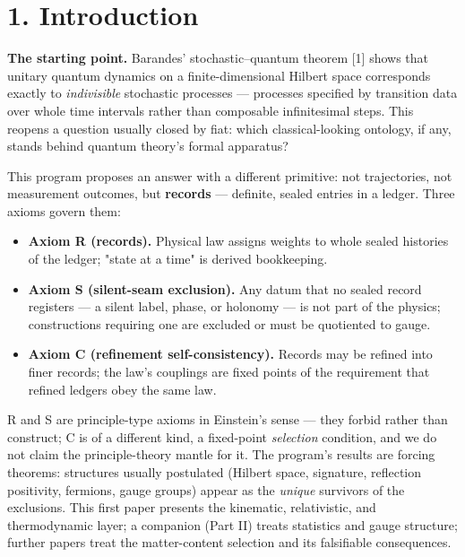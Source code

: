 \documentclass[11pt]{article}
\begin{document}
\section*{1. Introduction}
\textbf{The starting point.}  Barandes' stochastic–quantum theorem [1] shows that unitary quantum dynamics on a finite-dimensional Hilbert space corresponds exactly to \emph{indivisible} stochastic processes — processes specified by transition data over whole time intervals rather than composable infinitesimal steps.  This reopens a question usually closed by fiat: which classical-looking ontology, if any, stands behind quantum theory's formal apparatus?

This program proposes an answer with a different primitive: not trajectories, not measurement outcomes, but \textbf{records} — definite, sealed entries in a ledger.  Three axioms govern them:

\begin{itemize}
\item \textbf{Axiom R (records).}  Physical law assigns weights to whole sealed histories of the ledger; "state at a time" is derived bookkeeping.
\item \textbf{Axiom S (silent-seam exclusion).}  Any datum that no sealed record registers — a silent label, phase, or holonomy — is not part of the physics; constructions requiring one are excluded or must be quotiented to gauge.
\item \textbf{Axiom C (refinement self-consistency).}  Records may be refined into finer records; the law's couplings are fixed points of the requirement that refined ledgers obey the same law.
\end{itemize}
R and S are principle-type axioms in Einstein's sense — they forbid rather than construct; C is of a different kind, a fixed-point \emph{selection} condition, and we do not claim the principle-theory mantle for it.  The program's results are forcing theorems: structures usually postulated (Hilbert space, signature, reflection positivity, fermions, gauge groups) appear as the \emph{unique} survivors of the exclusions.  This first paper presents the kinematic, relativistic, and thermodynamic layer; a companion (Part II) treats statistics and gauge structure; further papers treat the matter-content selection and its falsifiable consequences.
\end{document}
